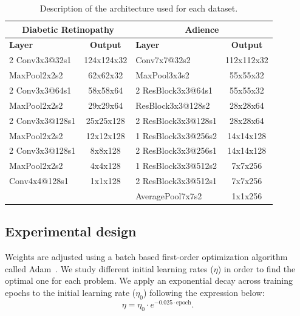 \documentclass[preprint]{elsarticle}
\begin{document}
\begin{table}[!t]
	\caption{Description of the architecture used for each dataset.}
	\label{table:Architecture}
	\centering
	\footnotesize
	\begin{tabular}{lclc}
		\hline\hline
		\multicolumn{2}{c}{\textbf{Diabetic Retinopathy}} & \multicolumn{2}{c}{\textbf{Adience}}  \\ \hline
		\textbf{Layer}  &         \textbf{Output}         & \textbf{Layer}      & \textbf{Output} \\ \hline
		2 Conv3x3@32s1  &           124x124x32            & Conv7x7@32s2        &   112x112x32    \\
		MaxPool2x2s2    &            62x62x32             & MaxPool3x3s2        &    55x55x32     \\
		2 Conv3x3@64s1  &            58x58x64             & 2 ResBlock3x3@64s1  &    55x55x32     \\
		MaxPool2x2s2    &            29x29x64             & ResBlock3x3@128s2   &    28x28x64     \\
		2 Conv3x3@128s1 &            25x25x128            & 2 ResBlock3x3@128s1 &    28x28x64     \\
		MaxPool2x2s2    &            12x12x128            & 1 ResBlock3x3@256s2 &    14x14x128    \\
		2 Conv3x3@128s1 &             8x8x128             & 2 ResBlock3x3@256s1 &    14x14x128    \\
		MaxPool2x2s2    &             4x4x128             & 1 ResBlock3x3@512s2 &     7x7x256     \\
		Conv4x4@128s1   &             1x1x128             & 2 ResBlock3x3@512s1 &     7x7x256     \\
		                &                                 & AveragePool7x7s2    &     1x1x256     \\ \hline\hline
	\end{tabular}	
\end{table}

\subsection{Experimental design}
\label{sect:settings}
Weights are adjusted using a batch based first-order optimization algorithm called Adam~\cite{kingma2014adam}. We study different initial learning rates ($\eta$) in order to find the optimal one for each problem. We apply an exponential decay \cite{chin2015learning} across training epochs to the initial learning rate ($\eta_0$) following the expression below:
\begin{equation}
\nonumber
\eta = \eta_0 \cdot e^{-0.025 \cdot \text{epoch}}.
\end{equation}
\end{document}
